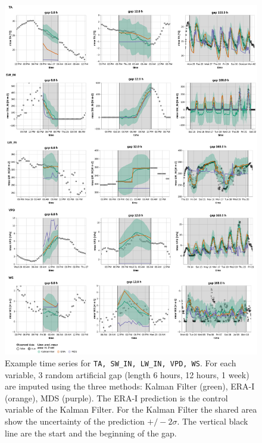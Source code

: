 \documentclass{article}
\newcommand{\imgwidth}{6in}
\begin{document}
\begin{figure}
\centerline{\includegraphics[width=\imgwidth]{timeseries_1}}
\caption{Example time series for \texttt{TA, SW\_IN, LW\_IN, VPD, WS}. For each variable, 3 random artificial gap (length 6 hours, 12 hours, 1 week) are imputed using the three methods: Kalman Filter (green), ERA-I (orange), MDS (purple). The ERA-I prediction is the control variable of the  Kalman Filter. For the Kalman Filter the shared area show the uncertainty of the prediction $+/- 2 \sigma$. The vertical black line are the start and the beginning of the gap.}
\label{fig:ts_1_0}
\end{figure}
\restoregeometry
\end{document}
